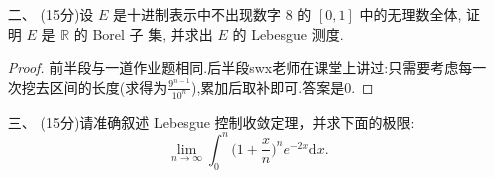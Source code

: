 \begin{itemize}
7.若 $f\colon[0,1]\to \mathbb{R} $ 是绝对连续函数，
则存在单调递增的绝对连续函数 $g,h\colon[0,1]\to \mathbb{R}$，使得 $f=g-h$. 

\begin{proof}[解答]
T.由于$f$绝对连续，$f(x)=f(0)+\int_0^x f'(t) \mathrm{d} t$且$f'(x)\in L^1([0,1]).$注意到这一点之后，取$h(x)=\int_0^x |f'(t)| \mathrm{d} t$便是自然的.
\end{proof}

8.若$ f $是$ \mathbb{R}  $上的Lebesgue可积函数, $ E_{n}=\{x\colon f(x)>n\},n=1,2,\cdots $,则$ \int_{E_{n}}f(x)\mathrm{d} x\to 0 $.

\begin{proof}[解答]
T. 可从积分的绝对连续性理解:因$ E_{n} $测度可足够小,在其上的积分也可足够小.
\end{proof}

9.设 $f\colon[0,1]\to \mathbb{R} $ 是有界函数.
那么 $f(x)$ 是Riemann可积函数当且仅当 $f(x^{2})$ 是Riemann可积函数.

\begin{proof}[解答]
我猜T. 它们应该共享不连续点集?然后同时Riemann可积?但有界条件不知道作用.

(afsd) 看不连续点集是正确的。有界性的要求在于，我们用“不连续点全体零测 $\Leftrightarrow$ Riemann可积”的这个判据时，它的前提就是要求函数是有界的，因为Riemann可积性天然要求有界。
\end{proof}

10.设 $\ f_{n} \colon \mathbb{R} \to \mathbb{R} ,n=1,2,\cdots$是一列
非负 Lebesgue 可测函数,满足$ \int _{\mathbb{R} }f_{n}(x)\mathrm{d} x=1 $.若 $f_{n}$ 依测度收敛于某个非负 Lebesgue可测函
数$ f\colon\mathbb{R} \to \mathbb{R}  $,则$ \int _{\mathbb{R} }f(x)\mathrm{d} x\le1 $.

\begin{proof}[解答]
T. 因$f_n$依测度收敛,其存在子列几乎处处收敛到$f$.此时在子列中使用Fatou引理即可.
\end{proof}

\item[二、](15分)设 $E$ 是十进制表示中不出现数字 $8$ 的 $[0,1]$ 中的无理数全体, 
证明 $E$ 是 $\mathbb{R}$ 的 Borel 子 集, 并求出 $E$ 的 Lebesgue 测度.
\begin{proof}
前半段与一道作业题相同.后半段swx老师在课堂上讲过:只需要考虑每一次挖去区间的长度(求得为$\frac{9^{n-1}}{10^n}$),累加后取补即可.答案是$0$.
\end{proof}

\item[三、](15分)请准确叙述 Lebesgue 控制收敛定理，并求下面的极限:
$$ \lim_{n\to \infty}\int_{0}^{n}\Big(1+\frac{x}{n}\Big)^{n}e^{-2x}\mathrm{d} x. $$


\end{itemize}
